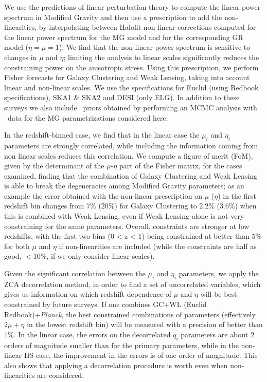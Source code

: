 We use the predictions of linear perturbation theory to compute the linear power spectrum in Modified Gravity and then
use a prescription to add the non-linearities, by interpolating between Halofit non-linear corrections computed for the linear power spectrum for the MG model and for the corresponding GR model ($\eta=\mu=1$). We find that the non-linear power spectrum is sensitive to 
changes in $\mu$ and $\eta$; limiting the analysis to linear scales significantly reduces the constraining power on the anisotropic stress.
Using this prescription, we perform Fisher forecasts for Galaxy Clustering and Weak Lensing, taking into account linear and non-linear scales. 
We use the specifications for Euclid (using Redbook specifications), SKA1 \& SKA2 and DESI (only ELG). In addition to these surveys we also include
\planck\ priors obtained by performing an MCMC analysis with \planck\ data for the MG parametrizations considered here.

In the redshift-binned case, we find that in the linear case the $\mu_i$ and $\eta_i$ parameters are strongly correlated, while including the information coming from non linear 
scales reduces this correlation. We compute a figure of merit (FoM), given by the determinant of the $\mu$-$\eta$ part of the Fisher matrix, for the cases examined, finding that 
the combination of Galaxy Clustering and Weak Lensing is able to break the degeneracies among Modified Gravity parameters; as an example the error obtained with the non-linear prescription on $\mu$ ($\eta$) in the first redshift bin changes 
from $7\%$ ($20\%$) for Galaxy Clustering to $2.2\%$ ($3.6\%$) when this is combined with Weak Lensing, even if Weak Lensing alone is not very constraining for the same parameters. 
Overall, constraints are stronger at low redshifts, with the first two bins (0 < z < 1) being constrained at better than $5\%$ for both $\mu$ and $\eta$ if non-linearities are included (while the constraints are half as good, $<10\%$, if we only consider linear scales).

Given the significant correlation between the $\mu_i$ and $\eta_i$ parameters, we apply the ZCA decorrelation method, in order to find a set of uncorrelated 
variables, which gives us information on which redshift dependence of $\mu$ and $\eta$ will be best constrained by future surveys. If one combines GC+WL (Euclid Redbook)+{\it Planck}, the best constrained combinations of parameters (effectively $2\mu+\eta$ in the lowest redshift bin) will be measured with a precision of better than 1\%.
In the linear case, the errors on the decorrelated $q_i$ parameters are about 2 orders of magnitude smaller than for the primary parameters, 
while in the non-linear HS case, the improvement in the errors is of one order of magnitude. This also shows that applying a decorrelation procedure is worth even when non-linearities are considered.

